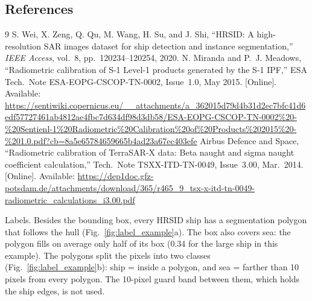 \documentclass[11pt,a4paper]{article}
\begin{document}
\subsection{References}
\begingroup
\renewcommand{\section}[2]{}%
\begin{thebibliography}{9}
S. Wei, X. Zeng, Q. Qu, M. Wang, H. Su, and J. Shi, ``HRSID: A high-resolution SAR images dataset for ship detection and instance segmentation,'' \emph{IEEE Access}, vol.~8, pp.~120234--120254, 2020.
N. Miranda and P.~J. Meadows, ``Radiometric calibration of S-1 Level-1 products generated by the S-1 IPF,'' ESA Tech.\ Note ESA-EOPG-CSCOP-TN-0002, Issue~1.0, May 2015. [Online]. Available: \url{https://sentiwiki.copernicus.eu/__attachments/a_362015d79d4b31d2ec7bfc41d6edf57727461ab4812ae4fbc7d634df98d3db58/ESA-EOPG-CSCOP-TN-0002%20-%20Sentienl-1%20Radiometric%20Calibration%20of%20Products%202015%20-%201.0.pdf?cb=8a5e65784659665b4ad23a67ec403efe}
Airbus Defence and Space, ``Radiometric calibration of TerraSAR-X data: Beta naught and sigma naught coefficient calculation,'' Tech.\ Note TSXX-ITD-TN-0049, Issue~3.00, Mar.\ 2014. [Online]. Available: \url{https://dep1doc.gfz-potsdam.de/attachments/download/365/r465_9_tsx-x-itd-tn-0049-radiometric_calculations_i3.00.pdf}
\end{thebibliography}
\endgroup

\section{Ship and Sea Amplitude Distribution}

\paragraph{Labels.} Besides the bounding box, every HRSID ship has a segmentation polygon that follows the hull
(Fig.~\ref{fig:label_example}a). The box also covers sea: the polygon fills on average only half of its box (0.34 for the large ship in this
example). The polygons split the pixels into two classes (Fig.~\ref{fig:label_example}b): ship = inside a polygon, and
sea = farther than 10 pixels from every polygon. The 10-pixel guard band between them, which holds the ship edges, is not
used.
\end{document}

